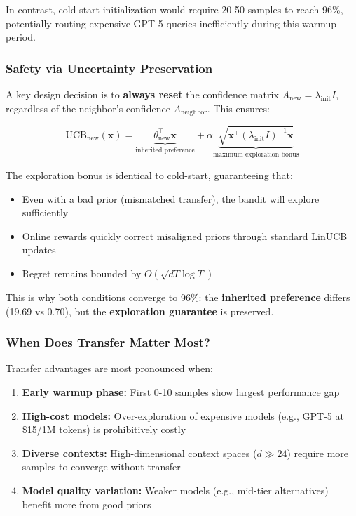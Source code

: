 \documentclass[sigconf,nonacm]{acmart}
\begin{document}
In contrast, cold-start initialization would require 20-50 samples to reach 96\%, potentially routing expensive GPT-5 queries inefficiently during this warmup period.

\subsubsection{Safety via Uncertainty Preservation}

A key design decision is to \textbf{always reset} the confidence matrix $A_{\text{new}} = \lambda_{\text{init}} I$, regardless of the neighbor's confidence $A_{\text{neighbor}}$. This ensures:

\begin{equation}
\text{UCB}_{\text{new}}(\mathbf{x}) = \underbrace{\theta_{\text{new}}^\top \mathbf{x}}_{\text{inherited preference}} + \alpha \underbrace{\sqrt{\mathbf{x}^\top (\lambda_{\text{init}} I)^{-1} \mathbf{x}}}_{\text{maximum exploration bonus}}
\end{equation}

The exploration bonus is identical to cold-start, guaranteeing that:
\begin{itemize}
    \item Even with a bad prior (mismatched transfer), the bandit will explore sufficiently
    \item Online rewards quickly correct misaligned priors through standard LinUCB updates
    \item Regret remains bounded by $O(\sqrt{dT \log T})$~\cite{abbasi2011improved}
\end{itemize}

This is why both conditions converge to 96\%: the \textbf{inherited preference} differs (19.69 vs 0.70), but the \textbf{exploration guarantee} is preserved.

\subsubsection{When Does Transfer Matter Most?}

Transfer advantages are most pronounced when:
\begin{enumerate}
    \item \textbf{Early warmup phase:} First 0-10 samples show largest performance gap
    \item \textbf{High-cost models:} Over-exploration of expensive models (e.g., GPT-5 at \$15/1M tokens) is prohibitively costly
    \item \textbf{Diverse contexts:} High-dimensional context spaces ($d \gg 24$) require more samples to converge without transfer
    \item \textbf{Model quality variation:} Weaker models (e.g., mid-tier alternatives) benefit more from good priors
\end{enumerate}
\end{document}
